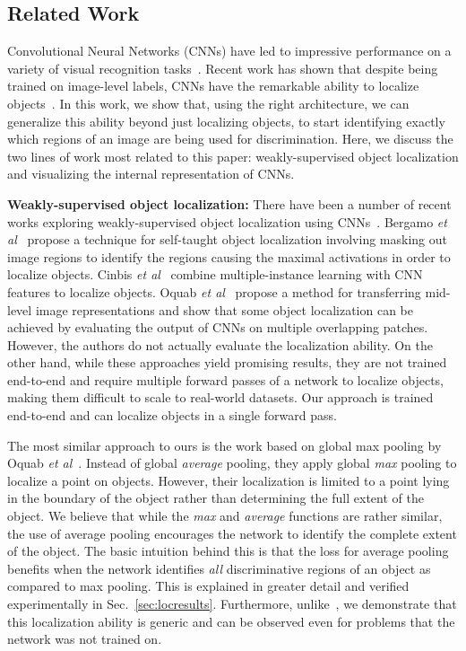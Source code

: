\documentclass[10pt,twocolumn,letterpaper]{article}
\begin{document}
\subsection{Related Work}
Convolutional Neural Networks (CNNs) have led to impressive performance on a variety of visual recognition tasks~\cite{krizhevsky2012imagenet,zhou2014learning,girshick2014rich}. Recent work has shown that despite being trained on image-level labels, CNNs have the remarkable ability to localize objects~\cite{bergamo2014self,oquab2014weakly,cinbis2015weakly,oquab2014learning}. In this work, we show that, using the right architecture, we can generalize this ability beyond just localizing objects, to start identifying exactly which regions of an image are being used for discrimination. Here, we discuss the two lines of work most related to this paper: weakly-supervised object localization and visualizing the internal representation of CNNs.

\textbf{Weakly-supervised object localization:} There have been a number of recent works exploring weakly-supervised object localization using CNNs~\cite{bergamo2014self,oquab2014weakly,cinbis2015weakly,oquab2014learning}. Bergamo \textit{et al}~\cite{bergamo2014self} propose a technique for self-taught object localization involving masking out image regions to identify the regions causing the maximal activations in order to localize objects. Cinbis \textit{et al}~\cite{cinbis2015weakly} combine multiple-instance learning with CNN features to localize objects.  
Oquab \textit{et al}~\cite{oquab2014learning} propose a method for transferring mid-level image representations and show that some object localization can be achieved by evaluating the output of CNNs on multiple overlapping patches. However, the authors do not actually evaluate the localization ability. On the other hand, while these approaches yield promising results, they are not trained end-to-end and require multiple forward passes of a network to localize objects, making them difficult to scale to real-world datasets. Our approach is trained end-to-end and can localize objects in a single forward pass.

The most similar approach to ours is the work based on global max pooling by Oquab \textit{et al}~\cite{oquab2014weakly}. Instead of global \textit{average} pooling, they apply global \textit{max} pooling to localize a point on objects. However, their localization is limited to a point lying in the boundary of the object rather than determining the full extent of the object. We believe that while the \textit{max} and \textit{average} functions are rather similar, the use of average pooling encourages the network to identify the complete extent of the object. The basic intuition behind this is that the loss for average pooling benefits when the network identifies \textit{all} discriminative regions of an object as compared to max pooling. This is explained in greater detail and verified experimentally in Sec.~\ref{sec:locresults}. Furthermore, unlike~\cite{oquab2014weakly}, we demonstrate that this localization ability is generic and can be observed even for problems that the network was not trained on.
\end{document}
